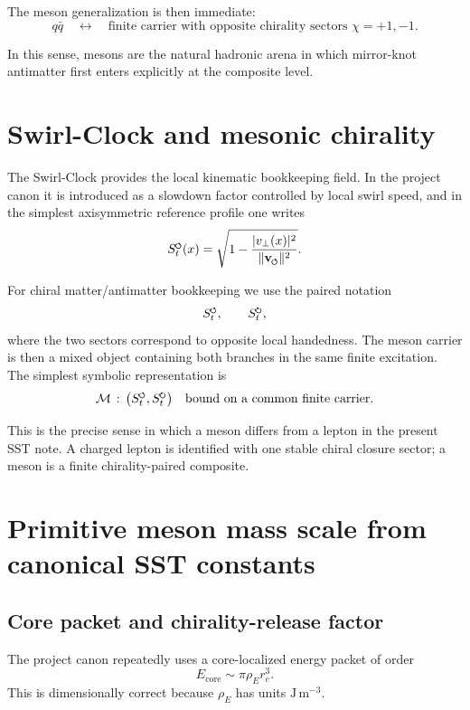 \documentclass[11pt,a4paper]{article}
\newcommand{\swirlarrow}{\mathchoice{\mkern-2mu\scriptstyle\boldsymbol{\circlearrowleft}}{\mkern-2mu\scriptstyle\boldsymbol{\circlearrowleft}}{\mkern-2mu\scriptscriptstyle\boldsymbol{\circlearrowleft}}{\mkern-2mu\scriptscriptstyle\boldsymbol{\circlearrowleft}}}
\newcommand{\swirlarrowcw}{\mathchoice{\mkern-2mu\scriptstyle\boldsymbol{\circlearrowright}}{\mkern-2mu\scriptstyle\boldsymbol{\circlearrowright}}{\mkern-2mu\scriptscriptstyle\boldsymbol{\circlearrowright}}{\mkern-2mu\scriptscriptstyle\boldsymbol{\circlearrowright}}}
\newcommand{\vswirl}{\mathbf{v}_{\swirlarrow}}
\newcommand{\SwirlClock}{S_t^{\swirlarrow}}
\newcommand{\SwirlClockcw}{S_t^{\swirlarrowcw}}
\newcommand{\rhoE}{\rho_{\!E}}
\newcommand{\rc}{r_c}
\begin{document}
The meson generalization is then immediate:
\begin{equation}
q\bar q
\quad \longleftrightarrow \quad
\text{finite carrier with opposite chirality sectors } \chi=+1,-1.
\label{eq:qqbarSST}
\end{equation}

In this sense, mesons are the natural hadronic arena in which mirror-knot antimatter first enters explicitly at the composite level.

\section{Swirl-Clock and mesonic chirality}
The Swirl-Clock provides the local kinematic bookkeeping field. In the project canon it is introduced as a slowdown factor controlled by local swirl speed, and in the simplest axisymmetric reference profile one writes
\begin{equation}
\SwirlClock(x)
= \sqrt{1 - \frac{|v_{\perp}(x)|^{2}}{\lVert \vswirl \rVert^{2}}}.
\label{eq:swirlclockbasic}
\end{equation}

For chiral matter/antimatter bookkeeping we use the paired notation
\begin{equation}
\SwirlClock,\qquad \SwirlClockcw,
\end{equation}
where the two sectors correspond to opposite local handedness. The meson carrier is then a mixed object containing both branches in the same finite excitation. The simplest symbolic representation is
\begin{equation}
\mathcal{M} \, : \,
\bigl(\SwirlClock,\SwirlClockcw\bigr)
\quad \text{bound on a common finite carrier.}
\label{eq:mesonswirlclock}
\end{equation}

This is the precise sense in which a meson differs from a lepton in the present SST note. A charged lepton is identified with one stable chiral closure sector; a meson is a finite chirality-paired composite.

\section{Primitive meson mass scale from canonical SST constants}
\subsection{Core packet and chirality-release factor}
The project canon repeatedly uses a core-localized energy packet of order
\begin{equation}
E_{\text{core}} \sim \pi \rhoE \rc^{3}.
\label{eq:corepacket}
\end{equation}
This is dimensionally correct because \(\rhoE\) has units \(\mathrm{J\,m^{-3}}\).
\end{document}
